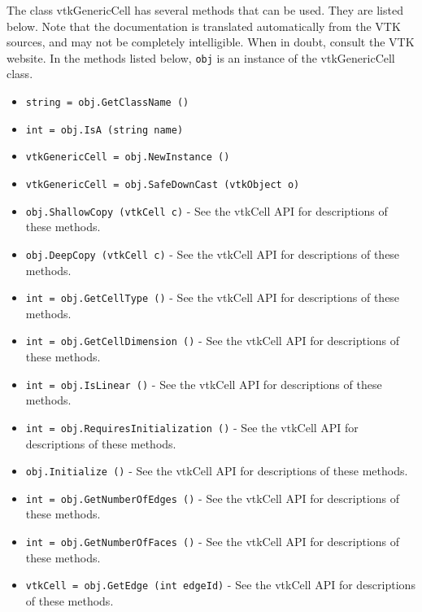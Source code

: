 The class vtkGenericCell has several methods that can be used.
  They are listed below.
Note that the documentation is translated automatically from the VTK sources,
and may not be completely intelligible.  When in doubt, consult the VTK website.
In the methods listed below, \verb|obj| is an instance of the vtkGenericCell class.
\begin{itemize}
\item  \verb|string = obj.GetClassName ()|

\item  \verb|int = obj.IsA (string name)|

\item  \verb|vtkGenericCell = obj.NewInstance ()|

\item  \verb|vtkGenericCell = obj.SafeDownCast (vtkObject o)|

\item  \verb|obj.ShallowCopy (vtkCell c)| -  See the vtkCell API for descriptions of these methods.

\item  \verb|obj.DeepCopy (vtkCell c)| -  See the vtkCell API for descriptions of these methods.

\item  \verb|int = obj.GetCellType ()| -  See the vtkCell API for descriptions of these methods.

\item  \verb|int = obj.GetCellDimension ()| -  See the vtkCell API for descriptions of these methods.

\item  \verb|int = obj.IsLinear ()| -  See the vtkCell API for descriptions of these methods.

\item  \verb|int = obj.RequiresInitialization ()| -  See the vtkCell API for descriptions of these methods.

\item  \verb|obj.Initialize ()| -  See the vtkCell API for descriptions of these methods.

\item  \verb|int = obj.GetNumberOfEdges ()| -  See the vtkCell API for descriptions of these methods.

\item  \verb|int = obj.GetNumberOfFaces ()| -  See the vtkCell API for descriptions of these methods.

\item  \verb|vtkCell = obj.GetEdge (int edgeId)| -  See the vtkCell API for descriptions of these methods.


\end{itemize}
